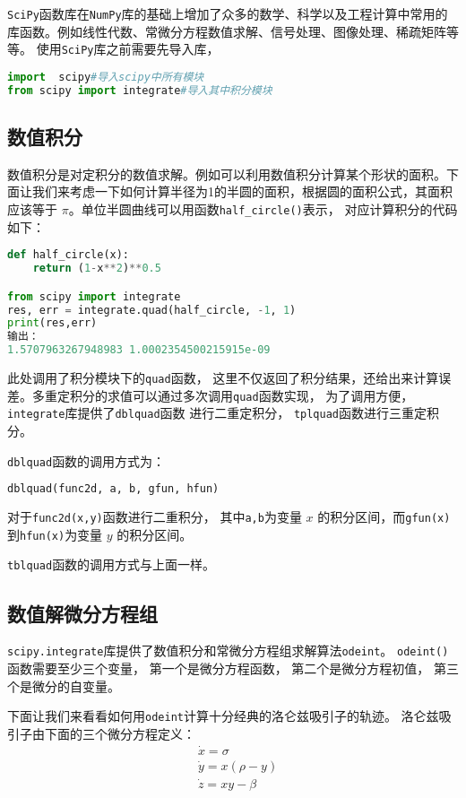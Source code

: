 
\verb|SciPy|函数库在\verb|NumPy|库的基础上增加了众多的数学、科学以及工程计算中常用的库函数。例如线性代数、常微分方程数值求解、信号处理、图像处理、稀疏矩阵等等。
使用\verb|SciPy|库之前需要先导入库，
\begin{lstlisting}[language=python]
import  scipy#导入scipy中所有模块
from scipy import integrate#导入其中积分模块
\end{lstlisting}
\subsection{数值积分}
数值积分是对定积分的数值求解。例如可以利用数值积分计算某个形状的面积。下面让我们来考虑一下如何计算半径为1的半圆的面积，根据圆的面积公式，其面积应该等于 $\pi$。单位半圆曲线可以用函数\verb|half_circle()|表示， 对应计算积分的代码如下：
\begin{lstlisting}[language=python]
def half_circle(x):
    return (1-x**2)**0.5

from scipy import integrate
res, err = integrate.quad(half_circle, -1, 1)
print(res,err)
输出：
1.5707963267948983 1.0002354500215915e-09
\end{lstlisting}
此处调用了积分模块下的\verb|quad|函数， 这里不仅返回了积分结果，还给出来计算误差。多重定积分的求值可以通过多次调用\verb|quad|函数实现， 为了调用方便， \verb|integrate|库提供了\verb|dblquad|函数
进行二重定积分， \verb|tplquad|函数进行三重定积分。

\verb|dblquad|函数的调用方式为：
\begin{lstlisting}[language=python]
dblquad(func2d, a, b, gfun, hfun)
\end{lstlisting}
对于\verb|func2d(x,y)|函数进行二重积分， 其中\verb|a,b|为变量 $x$ 的积分区间，而\verb|gfun(x)|到\verb|hfun(x)|为变量 $y$ 的积分区间。

\verb|tblquad|函数的调用方式与上面一样。

\subsection{数值解微分方程组}
\verb|scipy.integrate|库提供了数值积分和常微分方程组求解算法\verb|odeint|。
\verb|odeint()|函数需要至少三个变量， 第一个是微分方程函数， 第二个是微分方程初值， 第三个是微分的自变量。

下面让我们来看看如何用\verb|odeint|计算十分经典的洛仑兹吸引子的轨迹。 洛仑兹吸引子由下面的三个微分方程定义：
\begin{align}
&\dot{x}=\sigma\\
&\dot{y}=x(\rho-y)\\
&\dot{z}=xy-\beta
\end{align}

